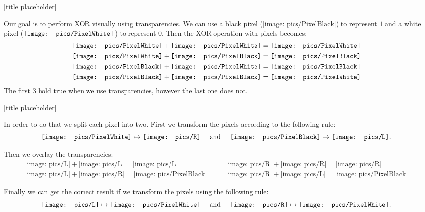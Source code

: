 \documentclass{beamer}
\newcommand{\pxWhite}{
 {\mathchoice
  {\texttt{[image: pics/PixelWhite]}}
  {\texttt{[image: pics/PixelWhite]}}
  {\texttt{[image: pics/PixelWhite]}}
  {\texttt{[image: pics/PixelWhite]}}
 }
}
\newcommand{\LL}{\mathord{\texttt{[image: pics/L]}}}
\newcommand{\RR}{\mathord{\texttt{[image: pics/R]}}}
\newcommand{\pxBlack}{\mathord{\texttt{[image: pics/PixelBlack]}}}
\begin{document}
\begin{frame}{[title placeholder]}

Our goal is to perform XOR visually using transparencies.
We can use a black pixel ($\pxBlack$) to represent $1$ and a white pixel ($\pxWhite$) to represent $0$. Then the XOR operation with pixels becomes:
\begin{align*}
 \pxWhite+\pxWhite=\pxWhite \\
 \pxWhite+\pxBlack=\pxBlack \\
 \pxBlack+\pxWhite=\pxBlack \\
 \pxBlack+\pxBlack=\pxWhite
\end{align*}
The first $3$ hold true when we use transparencies, however the last one does not.

\end{frame}


\begin{frame}{[title placeholder]}

In order to do that we split each pixel into two. First we transform the pixels according to the following rule:
\begin{equation*}
\pxWhite \mapsto \RR \quad\text{ and }\quad \pxBlack \mapsto \LL.
\end{equation*}

\pause
Then we overlay the transparencies:
\begin{align*}
\LL + \LL = \LL \quad & \quad \RR + \RR = \RR \\
\LL + \RR = \pxBlack \quad & \quad \RR + \LL = \pxBlack
\end{align*}

\pause
Finally we can get the correct result if we transform the pixels using the following rule:
\begin{equation*}
\LL \mapsto \pxWhite \quad\text{ and }\quad \RR \mapsto \pxWhite.
\end{equation*}

\end{frame}
\end{document}
